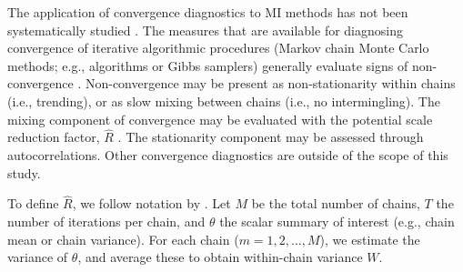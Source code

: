 \documentclass[article]{jss}
\begin{document}
The application of convergence diagnostics to MI methods has not been systematically studied \citep{buur18}. The measures that are available for diagnosing convergence of iterative algorithmic procedures (Markov chain Monte Carlo methods; e.g.,  algorithms or Gibbs samplers) generally evaluate signs of non-convergence \citep{hoff09}. Non-convergence may be present as non-stationarity within chains (i.e., trending), or as slow mixing between chains (i.e., no intermingling). 
The mixing component of convergence may be evaluated with the potential scale reduction factor, $\widehat{R}$ \citep[a.k.a. `Gelman-Rubin statistic';][]{gelm92}\footnotemark. The stationarity component may be assessed through autocorrelations. Other convergence diagnostics are outside of the scope of this study.


To define $\widehat{R}$, we follow notation by \cite[p.~5]{veht19}. Let $M$ be the total number of chains, $T$ the number of iterations per chain, and $\theta$ the scalar summary of interest (e.g., chain mean or chain variance). For each chain ($m = 1, 2, \dots, M$), we estimate the variance of $\theta$, and average these to obtain within-chain variance $W$.
\end{document}
